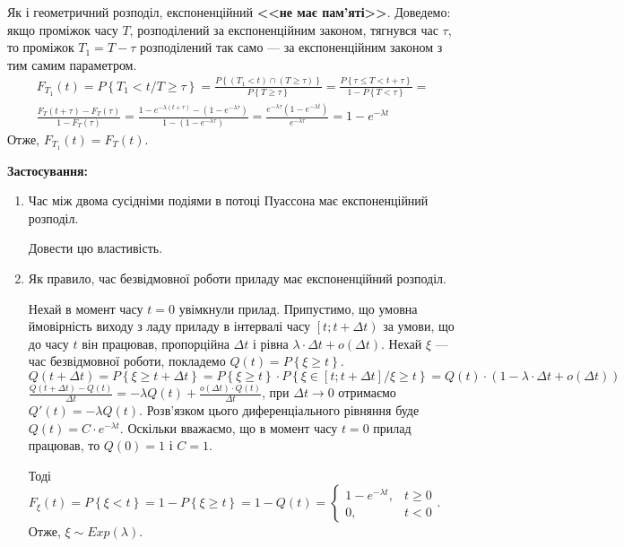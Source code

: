 Як і геометричний розподіл, експоненційний \textbf{<<не має пам'яті>>}.
Доведемо: якщо проміжок часу $T$, розподілений за експоненційним законом,
тягнувся час $\tau$, то проміжок $T_1 = T - \tau$ розподілений так само --- 
за експоненційним законом з тим самим параметром.
\begin{gather*}
    F_{T_1}(t) = P\left\{T_1 < t / T \geq \tau\right\} = 
    \frac{P\left\{(T_1 < t) \cap (T \geq \tau)\right\}}{P\left\{ T \geq \tau \right\}} =
    \frac{P{\left\{\tau \leq T < t +\tau\right\}}}{1 - P\left\{ T < \tau \right\}} = \\
    \frac{F_T(t+\tau) - F_T(\tau)}{1-F_T(\tau)} = 
    \frac{1-e^{-\lambda (t+\tau)} - (1 - e^{-\lambda \tau})}{1-(1-e^{-\lambda \tau})} =
    \frac{e^{-\lambda \tau}(1-e^{-\lambda t})}{e^{-\lambda \tau}} = 1-e^{-\lambda t}
\end{gather*}
Отже, $F_{T_1}(t) = F_T(t)$.

\noindent\textbf{Застосування:}
\begin{enumerate}
    \item Час між двома сусідніми подіями в потоці Пуассона має експоненційний розподіл.
    \begin{exercise}
        Довести цю властивість.
    \end{exercise}
    \item Як правило, час безвідмовної роботи приладу має експоненційний розподіл.
    
    Нехай в момент часу $t=0$ увімкнули прилад. Припустимо, що умовна ймовірність виходу з ладу
    приладу в інтервалі часу $\left[ t; t+\Delta t\right)$ за умови, що до часу $t$ він працював,
    пропорційна $\Delta t$ і рівна $\lambda\cdot \Delta t + o(\Delta t)$. Нехай $\xi$ --- час безвідмовної роботи,
    покладемо $Q(t) = P\left\{\xi \geq t\right\}$.
    $Q(t+\Delta t) = P\left\{\xi \geq t + \Delta t\right\} = P\left\{\xi \geq t\right\} \cdot P\left\{\xi \in \left[t; t+\Delta t\right] / \xi \geq t\right\} = 
    Q(t) \cdot (1 - \lambda\cdot \Delta t + o(\Delta t))$
    $\frac{Q(t+\Delta t) - Q(t)}{\Delta t} = -\lambda Q(t) + \frac{o(\Delta t)\cdot Q(t)}{\Delta t}$,
    при $\Delta t \rightarrow 0$ отримаємо $Q'(t) = -\lambda Q(t)$.
    Розв'язком цього диференціального рівняння буде $Q(t) = C\cdot e^{-\lambda t}$.
    Оскільки вважаємо, що в момент часу $t=0$ прилад працював, то $Q(0) = 1$ і $C=1$.

    Тоді $F_\xi(t) = P\left\{ \xi < t\right\} = 1 - P\left\{ \xi \geq t\right\} = 1 - Q(t) = \begin{cases}
        1 - e^{-\lambda t}, & t \geq 0 \\
        0, & t < 0
    \end{cases}$. Отже, $\xi \sim {Exp}(\lambda)$.
\end{enumerate}

